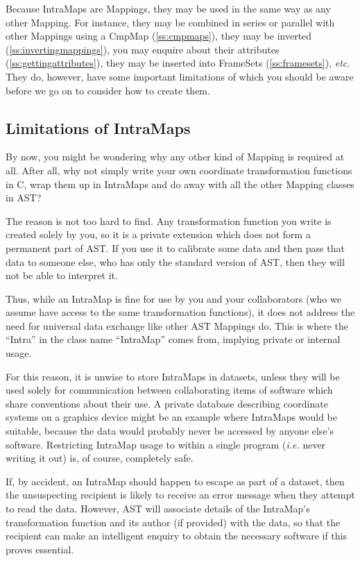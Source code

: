 \documentclass[twoside,11pt]{article}
\newcommand{\htmlref}[2]{#1}
\newcommand{\secref}[1]{\S\ref{#1}}
\renewcommand{\secref}[1]{\ref{#1}}
\begin{document}
Because IntraMaps are Mappings, they may be used in the same way as
any other Mapping. For instance, they may be combined in series or
parallel with other Mappings using a \htmlref{CmpMap}{CmpMap} (\secref{ss:cmpmaps}),
they may be inverted (\secref{ss:invertingmappings}), you may enquire
about their attributes (\secref{ss:gettingattributes}), they may be
inserted into FrameSets (\secref{ss:framesets}), {\em{etc.}} They do,
however, have some important limitations of which you should be aware
before we go on to consider how to create them.

\subsection{\label{ss:intramaplimitations}Limitations of IntraMaps}

By now, you might be wondering why any other kind of \htmlref{Mapping}{Mapping} is
required at all. After all, why not simply write your own coordinate
transformation functions in C, wrap them up in IntraMaps and do away
with all the other Mapping classes in AST?

The reason is not too hard to find. Any transformation function you
write is created solely by you, so it is a private extension which
does not form a permanent part of AST. If you use it to calibrate some
data and then pass that data to someone else, who has only the
standard version of AST, then they will not be able to interpret it.

Thus, while an \htmlref{IntraMap}{IntraMap} is fine for use by you and your collaborators
(who we assume have access to the same transformation functions), it
does not address the need for universal data exchange like other AST
Mappings do. This is where the ``Intra'' in the class name
``IntraMap'' comes from, implying private or internal usage.

For this reason, it is unwise to store IntraMaps in datasets, unless
they will be used solely for communication between collaborating items
of software which share conventions about their use.  A private
database describing coordinate systems on a graphics device might be
an example where IntraMaps would be suitable, because the data would
probably never be accessed by anyone else's software. Restricting
IntraMap usage to within a single program ({\em{i.e.}} never writing
it out) is, of course, completely safe.

If, by accident, an IntraMap should happen to escape as part of a
dataset, then the unsuspecting recipient is likely to receive an error
message when they attempt to read the data. However, AST will
associate details of the IntraMap's transformation function and its
author (if provided) with the data, so that the recipient can make an
intelligent enquiry to obtain the necessary software if this proves
essential.
\end{document}

